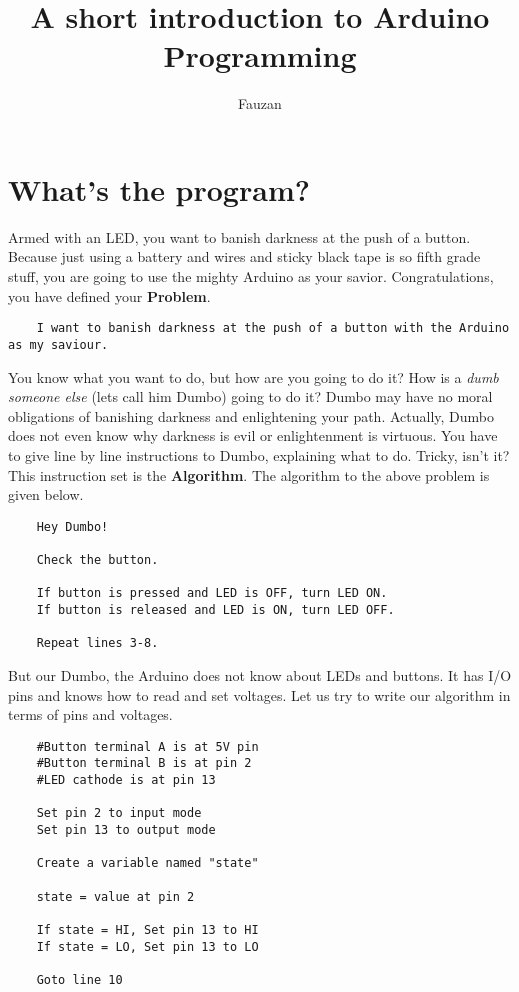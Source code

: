 \documentclass{article}
\begin{document}
\newcommand{\inlncd}[1]{\colorbox{lgray}{\texttt{#1}}}




\title{A short introduction to Arduino Programming}
\author{Fauzan}
\maketitle

\section{What's the program?}
	Armed with an LED, you want to banish darkness at the push of a button\@. Because just using a battery and wires and sticky black tape is so fifth grade stuff, you are going to use the mighty Arduino as your savior. Congratulations, you have defined your \textbf{Problem}.

	\begin{lstlisting}
	I want to banish darkness at the push of a button with the Arduino as my saviour.
	\end{lstlisting}

	You know what you want to do, but how are you going to do it? How is a \textit{dumb someone else} (lets call him Dumbo) going to do it? Dumbo may have no moral obligations of banishing darkness and enlightening your path. Actually, Dumbo does not even know why darkness is evil or enlightenment is virtuous. You have to give line by line instructions to Dumbo, explaining what to do. Tricky, isn't it? This instruction set is the \textbf{Algorithm}. The algorithm to the above problem is given below.

	\begin{lstlisting}
	Hey Dumbo!

	Check the button.

	If button is pressed and LED is OFF, turn LED ON.
	If button is released and LED is ON, turn LED OFF.

	Repeat lines 3-8.
	\end{lstlisting}

	But our Dumbo, the Arduino does not know about LEDs and buttons. It has I/O pins and knows how to read and set voltages. Let us try to write our algorithm in terms of pins and voltages.

	\begin{lstlisting}
	#Button terminal A is at 5V pin
	#Button terminal B is at pin 2
	#LED cathode is at pin 13

	Set pin 2 to input mode
	Set pin 13 to output mode

	Create a variable named "state"

	state = value at pin 2

	If state = HI, Set pin 13 to HI
	If state = LO, Set pin 13 to LO

	Goto line 10
	\end{lstlisting}
\end{document}
